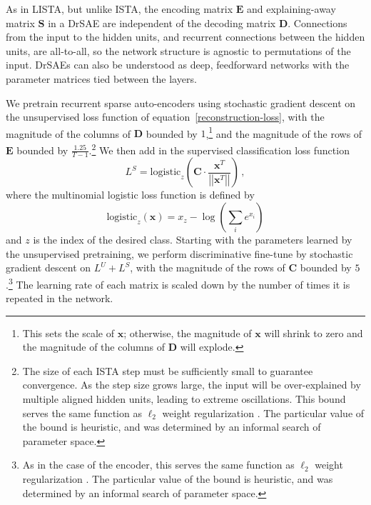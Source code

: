 \documentclass{article} %
\newcommand{\x}{\mathbf{x}}
\newcommand{\C}{\mathbf{C}}
\newcommand{\D}{\mathbf{D}}
\newcommand{\E}{\mathbf{E}}
\newcommand{\Sm}{\mathbf{S}}
\newcommand{\logistic}{\text{logistic}}
\begin{document}
As in LISTA, but unlike ISTA, the encoding matrix $\E$ and explaining-away matrix $\Sm$ in a DrSAE are independent of the decoding matrix $\D$.
Connections from the input to the hidden units, and recurrent connections between the hidden units, are all-to-all, so the network structure is agnostic to permutations of the input.    
DrSAEs can also be understood as deep, feedforward networks with the parameter matrices tied between the layers.


We pretrain recurrent sparse auto-encoders using stochastic gradient descent on the unsupervised loss function of equation~\ref{reconstruction-loss}, with the magnitude of the columns of $\D$ bounded by $1$,\footnote{This sets the scale of $\x$; otherwise, the magnitude of $\x$ will shrink to zero and the magnitude of the columns of $\D$ will explode.} and the magnitude of the rows of $\E$ bounded by $\frac{1.25}{T-1}$.\footnote{The size of each ISTA step must be sufficiently small to guarantee convergence.  As the step size grows large, the input will be over-explained by multiple aligned hidden units, leading to extreme oscillations.  This bound serves the same function as $\ell_2$ weight regularization \citep{hinton2010}.  The particular value of the bound is heuristic, and was determined by an informal search of parameter space.}  We then add in the supervised classification loss function
\begin{equation} \label{discriminative-loss}
L^S = \logistic_z \left( \C \cdot \frac{\x^T}{\left|\left| \x^T \right|\right|} \right) \, ,
\end{equation}
where the multinomial logistic loss function is defined by 
\begin{equation*}
  \logistic_z(\x) = x_z - \log\left( \sum_i e^{x_i} \right) 
\end{equation*}
and $z$ is the index of the desired class.
Starting with the parameters learned by the unsupervised pretraining, we perform discriminative fine-tune by stochastic gradient descent on $L^U + L^S$, with the magnitude of the rows of $\C$ bounded by $5$.\footnote{As in the case of the encoder, this serves the same function as $\ell_2$ weight regularization \citep{hinton2010}.  The particular value of the bound is heuristic, and was determined by an informal search of parameter space.}  The learning rate of each matrix is scaled down by the number of times it is repeated in the network.
\end{document}

